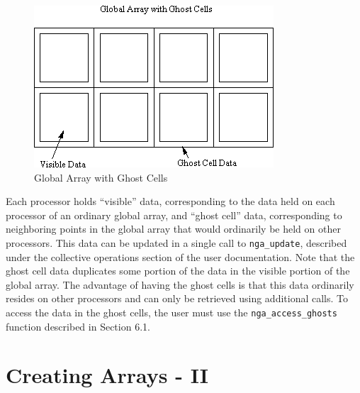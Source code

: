 %
\begin{figure}
\begin{centering}
\includegraphics[width=0.9\columnwidth]{ghost006}
\par\end{centering}

\caption{\label{cap:GAwGhostCells} Global Array with Ghost Cells}

\end{figure}


Each processor holds \textquotedblleft{}visible\textquotedblright{}
data, corresponding to the data held on each processor of an ordinary
global array, and \textquotedblleft{}ghost cell\textquotedblright{}
data, corresponding to neighboring points in the global array that
would ordinarily be held on other processors. This data can be updated
in a single call to \texttt{nga\_update}, described under the collective
operations section of the user documentation. Note that the ghost
cell data duplicates some portion of the data in the visible portion
of the global array. The advantage of having the ghost cells is that
this data ordinarily resides on other processors and can only be retrieved
using additional calls. To access the data in the ghost cells, the
user must use the \texttt{nga\_access\_ghosts} function described
in Section 6.1. 


\section{Creating Arrays - II}

